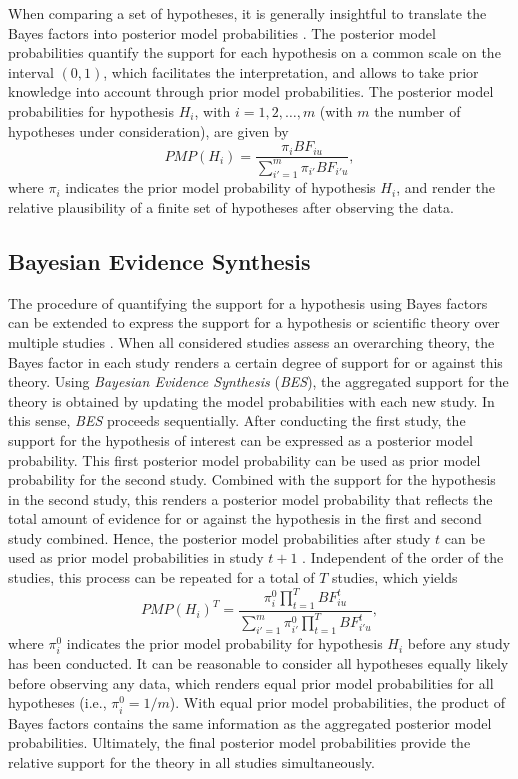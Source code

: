 \documentclass[review, 3p, authoryear]{elsarticle} %
\begin{document}
When comparing a set of hypotheses, it is generally insightful to translate the Bayes factors into posterior model probabilities \citep[\(PMP\)s;][]{kass_raftery_bayes_factors_1995}.
The posterior model probabilities quantify the support for each hypothesis on a common scale on the interval \((0,1)\), which facilitates the interpretation, and allows to take prior knowledge into account through prior model probabilities.
The posterior model probabilities for hypothesis \(H_i\), with \(i = 1, 2, \dots, m\) (with \(m\) the number of hypotheses under consideration), are given by
\[
PMP(H_{i}) = \frac{\pi_i BF_{iu}}{\sum^m_{i'=1} \pi_{i'} BF_{i'u}}, 
\]
where \(\pi_i\) indicates the prior model probability of hypothesis \(H_i\), and render the relative plausibility of a finite set of hypotheses after observing the data.

\hypertarget{bayesian-evidence-synthesis}{%
\subsection{Bayesian Evidence Synthesis}\label{bayesian-evidence-synthesis}}

The procedure of quantifying the support for a hypothesis using Bayes factors can be extended to express the support for a hypothesis or scientific theory over multiple studies \citep{kuiper_combining_2013}.
When all considered studies assess an overarching theory, the Bayes factor in each study renders a certain degree of support for or against this theory.
Using \emph{Bayesian Evidence Synthesis} (\emph{BES}), the aggregated support for the theory is obtained by updating the model probabilities with each new study.
In this sense, \emph{BES} proceeds sequentially.
After conducting the first study, the support for the hypothesis of interest can be expressed as a posterior model probability.
This first posterior model probability can be used as prior model probability for the second study.
Combined with the support for the hypothesis in the second study, this renders a posterior model probability that reflects the total amount of evidence for or against the hypothesis in the first and second study combined.
Hence, the posterior model probabilities after study \(t\) can be used as prior model probabilities in study \(t + 1\) \citep{kuiper_combining_2013}.
Independent of the order of the studies, this process can be repeated for a total of \(T\) studies, which yields
\[
PMP(H_i)^T = \frac{\pi^0_{i} \prod^T_{t=1} BF^t_{iu}}{\sum^m_{i'=1} \pi^0_{i'} \prod^T_{t=1} BF^t_{i'u}},
\]
where \(\pi^0_i\) indicates the prior model probability for hypothesis \(H_i\) before any study has been conducted.
It can be reasonable to consider all hypotheses equally likely before observing any data, which renders equal prior model probabilities for all hypotheses (i.e., \(\pi^0_i = 1/m\)).
With equal prior model probabilities, the product of Bayes factors contains the same information as the aggregated posterior model probabilities.
Ultimately, the final posterior model probabilities provide the relative support for the theory in all studies simultaneously.
\end{document}
